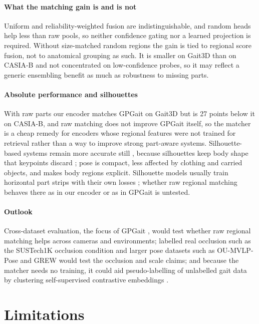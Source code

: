 \documentclass[journal]{IEEEtran}
\begin{document}
\paragraph{What the matching gain is and is not}
Uniform and reliability-weighted fusion are indistinguishable, and random
heads help less than raw pools, so neither confidence gating nor a learned
projection is required. Without size-matched random regions the gain is tied to
regional score fusion, not to anatomical grouping as such. It is smaller on
Gait3D than on CASIA-B and not concentrated on low-confidence probes, so it may
reflect a generic ensembling benefit as much as robustness to missing parts.

\paragraph{Absolute performance and silhouettes}
With raw parts our encoder matches GPGait on Gait3D but is 27 points below it
on CASIA-B, and raw matching does not improve GPGait itself, so the matcher is a
cheap remedy for encoders whose regional features were not trained for
retrieval rather than a way to improve strong part-aware systems.
Silhouette-based systems remain more accurate still
\cite{chao2019gaitset,fan2020gaitpart,lin2021gaitgl,fan2022opengait}, because
silhouettes keep body shape that keypoints discard \cite{fu2023gpgait}; pose is
compact, less affected by clothing and carried objects, and makes body regions
explicit. Silhouette models usually train horizontal part strips with their own
losses \cite{chao2019gaitset,fan2020gaitpart}; whether raw regional matching
behaves there as in our encoder or as in GPGait is untested.

\paragraph{Outlook}
Cross-dataset evaluation, the focus of GPGait \cite{fu2023gpgait}, would test
whether raw regional matching helps across cameras and environments; labelled
real occlusion such as the SUSTech1K occlusion condition \cite{shen2023lidargait}
and larger pose datasets such as OU-MVLP-Pose and GREW
\cite{an2020oumvlppose,zhu2021grew} would test the occlusion and scale claims;
and because the matcher needs no training, it could aid pseudo-labelling of
unlabelled gait data by clustering self-supervised contrastive embeddings
\cite{cosma2026gaitpt}.

\section{Limitations}
\label{sec:limitations}
\end{document}
